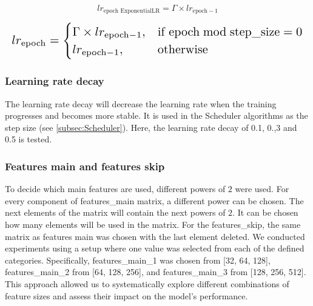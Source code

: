 \documentclass[twocolumn]{article}
\begin{document}
\begin{equation}\label{eq:1}
lr_{\text{epoch ExponentialLR}} = \Gamma \times lr_{\text{epoch}-1}
\end{equation}

\begin{equation}\label{eq:2}
\resizebox{1.\hsize}{!}{$
lr_{\text{epoch}} =
\begin{cases}
\Gamma \times lr_{\text{epoch}-1}, & \text{if } \text{epoch} \bmod \text{step\_size} = 0 \\
lr_{\text{epoch}-1}, & \text{otherwise}
\end{cases}
$}
\end{equation}

\subsubsection{Learning rate decay}
The learning rate decay will decrease the learning rate when the training progresses and becomes more stable. 
It is used in the Scheduler algorithms as the step size (see \ref{subsec:Scheduler}). 
Here, the learning rate decay of 0.1, 0.,3 and 0.5 is tested.

\subsubsection{Features main and features skip}
To decide which main features are used, different powers of $2$ were used. 
For every component of features\_main matrix, a different power can be chosen. 
The next elements of the matrix will contain the next powers of $2$. It can be chosen how many elements will be used in the matrix. 
For the features\_skip, the same matrix as features main was chosen with the last element deleted. 
We conducted experiments using a setup where one value was selected from each of the defined categories. 
Specifically, features\_main\_1 was chosen from [32, 64, 128], features\_main\_2 from [64, 128, 256], and features\_main\_3 from [128, 256, 512]. 
This approach allowed us to systematically explore different combinations of feature sizes and assess their impact on the model's performance.
\end{document}
